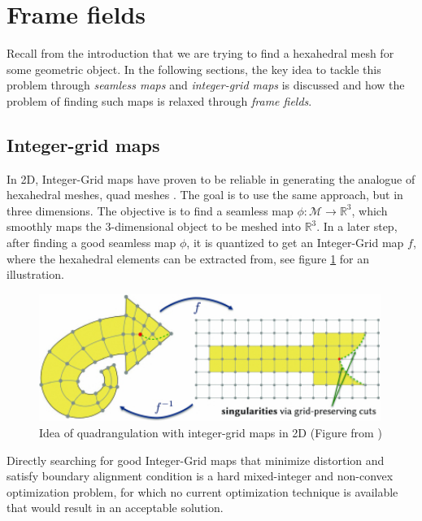 \documentclass[../thesis.tex]{subfiles}
\begin{document}
\section{Frame fields}
Recall from the introduction that we are trying to find a hexahedral mesh
for some geometric object. In the following sections, the key idea to
tackle this problem through \emph{seamless maps} and \emph{integer-grid maps} is discussed and
how the problem of finding such maps is relaxed through \emph{frame fields}.
\subsection{Integer-grid maps}

In 2D, Integer-Grid maps have proven to be reliable
in generating the analogue of hexahedral meshes, quad meshes \cite{integer-grid}.
The goal is to use the same approach, but in three dimensions.
The objective is to find a seamless map
$\phi : \mathcal{M} \to \mathbb{R}^3$, which smoothly maps the $3$-dimensional object
to be meshed into $\mathbb{R}^3$.
In a later step, after finding a good seamless map $\phi$, it is quantized to get an
Integer-Grid map $f$, where the hexahedral elements can be extracted from,  see figure \ref{fig:integer-grid} for an illustration.
\begin{figure}[htb]
  \centering
  \includegraphics[width=30em]{figures/integer-grid-rough}
  \caption{Idea of quadrangulation with integer-grid maps in 2D (Figure from \cite{Hex22})}
  \label{fig:integer-grid}
\end{figure}
Directly searching for good Integer-Grid maps that minimize distortion and satisfy boundary alignment
condition is a hard mixed-integer and non-convex optimization problem, for which no current
optimization technique is available that would result in an acceptable solution.
\end{document}
